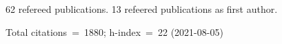 62 refereed publications. 13 refeered publications as first author.

Total citations~=~1880; h-index~=~22 (2021-08-05)